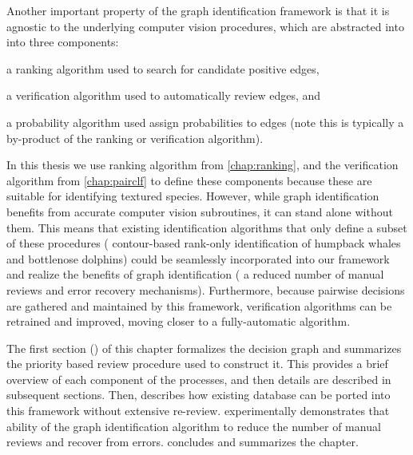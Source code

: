 Another important property of the graph identification framework is that it is agnostic to the underlying computer
vision procedures, which are abstracted into into three components:
\begin{enumin}
\item a ranking algorithm used to search for candidate positive edges, %
\item a verification algorithm used to automatically review edges, and %
\item a probability algorithm used assign probabilities to edges (note this is typically a by-product of the
ranking or verification algorithm).
\end{enumin}
In this thesis we use ranking algorithm from \cref{chap:ranking}, and the verification algorithm from
\cref{chap:pairclf} to define these components because these are suitable for identifying textured species.
However, while graph identification benefits from accurate computer vision subroutines, it can stand alone without
them.  This means that existing identification algorithms that only define a subset of these procedures (\eg{}
contour-based rank-only identification of humpback whales and bottlenose dolphins) could be seamlessly incorporated
into our framework and realize the benefits of graph identification (\eg{} a reduced number of manual reviews and
error recovery mechanisms).  Furthermore, because pairwise decisions are gathered and maintained by this framework,
verification algorithms can be retrained and improved, moving closer to a fully-automatic algorithm.


The first section () of this chapter formalizes the decision graph and summarizes the
  priority based review procedure used to construct it.
This provides a brief overview of each component of the processes, and then details are described in subsequent
  sections.
Then,  describes how existing database can be ported into this framework without extensive
  re-review.
 experimentally demonstrates that ability of the graph identification algorithm to reduce the
  number of manual reviews and recover from errors.
 concludes and summarizes the chapter.



